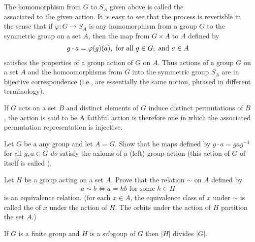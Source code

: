 \documentclass[10pt,a4paper]{report}
\begin{document}
\begin{definition} The homomorphism from $G$ to $S_A$ given above is called the \\  associated to the given action.  It is easy to see that the process is reverisble in the sense that if $\varphi: G \to S_A$ is any homomorphism from a group $G$ to the symmetric group on a set $A$, then the map from $G\times A$ to $A$ defined by 
\begin{align*}
	g\cdot a=\varphi(g)(a), \text{ for all } g \in G, \text{ and } a \in A
\end{align*}satisfies the properties of a group action of $G$ on $A$.  Thus actions of a group $G$ on a set $A$ and the homoomorphisms from $G$ into the symmetric group $S_A$ are in bijective correspondence (i.e., are essentially the same notion, phrased in different terminology).
\end{definition}

\begin{definition}If $G$ acts on a set $B$ and distinct elements of $G$ induce distinct permutations of $B$, the action is said to be   A faithful action is therefore one in which the associated permutation representation is injective.
\end{definition}

\begin{definition}[Conjugation]Let $G$ be a any group and let $A = G$.  Show that he maps defined by $g\cdot a=gag^{-1}$ for all $g,a\in G$ \textit{do} satisfy the axioms of a (left) group action (this action of $G$ of itself is called ).
\end{definition}

\begin{definition}[Orbits]Let $H$ be a group acting on a set $A$.  Prove that the relation $\sim$ on $A$ defined by 
	\begin{align*}
		a \sim b \iff a =hb \text{ for some } h \in H
	\end{align*}is an equivalence relation.  (for each $x \in A$, the equivalence class of $x$ under $\sim$ is called the  of $x$ under the action of $H$.  The orbits under the action of $H$ partition the set $A$.)
\end{definition} 

\begin{theorem}
	\begin{center}
		If $G$ is a finite group and $H$ is a subgoup of $G$ then $|H|$ divides $|G|$.
	\end{center}
\end{theorem}
\end{document}
